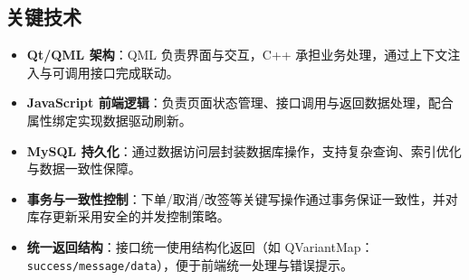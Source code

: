 \documentclass{article}
\begin{document}
	\subsection{关键技术}
	\begin{itemize}
		\item \textbf{Qt/QML 架构}：QML 负责界面与交互，C++ 承担业务处理，通过上下文注入与可调用接口完成联动。
		\item \textbf{JavaScript 前端逻辑}：负责页面状态管理、接口调用与返回数据处理，配合属性绑定实现数据驱动刷新。
		\item \textbf{MySQL 持久化}：通过数据访问层封装数据库操作，支持复杂查询、索引优化与数据一致性保障。
		\item \textbf{事务与一致性控制}：下单/取消/改签等关键写操作通过事务保证一致性，并对库存更新采用安全的并发控制策略。
		\item \textbf{统一返回结构}：接口统一使用结构化返回（如 QVariantMap：\texttt{success/message/data}），便于前端统一处理与错误提示。
	\end{itemize}
	
\end{document}
